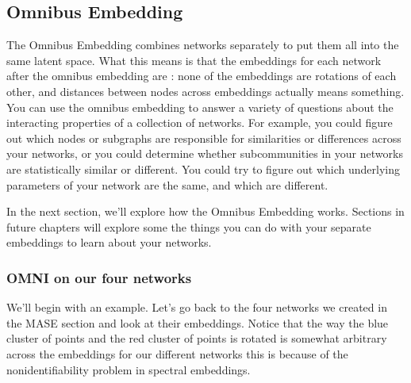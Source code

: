 \documentclass[letterpaper,10pt,english]{jupyterBook}
\begin{document}
\subsection{Omnibus Embedding}
\label{\detokenize{representations/ch6/multigraph-representation-learning:omnibus-embedding}}
\sphinxAtStartPar
The Omnibus Embedding combines networks separately to put them all into the same latent space. What this means is that the embeddings for each network after the omnibus embedding are : none of the embeddings are rotations of each other, and distances between nodes across embeddings actually means something. You can use the omnibus embedding to answer a variety of questions about the interacting properties of a collection of networks. For example, you could figure out which nodes or subgraphs are responsible for similarities or differences across your networks, or you could determine whether subcommunities in your networks are statistically similar or different. You could try to figure out which underlying parameters of your network are the same, and which are different.

\sphinxAtStartPar
In the next section, we’ll explore how the Omnibus Embedding works. Sections in future chapters will explore some the things you can do with your separate embeddings to learn about your networks.


\subsubsection{OMNI on our four networks}
\label{\detokenize{representations/ch6/multigraph-representation-learning:omni-on-our-four-networks}}
\sphinxAtStartPar
We’ll begin with an example. Let’s go back to the four networks we created in the MASE section and look at their embeddings. Notice that the way the blue cluster of points and the red cluster of points is rotated is somewhat arbitrary across the embeddings for our different networks \sphinxhyphen{} this is because of the nonidentifiability problem in spectral embeddings.
\end{document}
